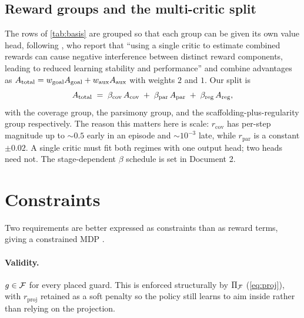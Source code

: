 \documentclass[11pt,a4paper]{article}
\begin{document}
\subsection{Reward groups and the multi-critic split}

The rows of \cref{tab:basis} are grouped so that each group can be given its own value
head, following \citet{wang2025vision}, who report that ``using a single critic to estimate
combined rewards can cause negative interference between distinct reward components,
leading to reduced learning stability and performance'' and combine advantages as
$A_{\mathrm{total}} = w_{\mathrm{goal}}A_{\mathrm{goal}} + w_{\mathrm{aux}}A_{\mathrm{aux}}$
with weights $2$ and $1$. Our split is
\begin{equation}\label{eq:multicritic}
  A_{\mathrm{total}}
  \;=\; \beta_{\mathrm{cov}}\,A_{\mathrm{cov}}
  \;+\; \beta_{\mathrm{par}}\,A_{\mathrm{par}}
  \;+\; \beta_{\mathrm{reg}}\,A_{\mathrm{reg}} ,
\end{equation}
with the coverage group, the parsimony group, and the scaffolding-plus-regularity group
respectively. The reason this matters here is scale: $r_{\mathrm{cov}}$ has per-step
magnitude up to $\sim 0.5$ early in an episode and $\sim 10^{-3}$ late, while
$r_{\mathrm{par}}$ is a constant $\pm 0.02$. A single critic must fit both regimes with one
output head; two heads need not. The stage-dependent $\beta$ schedule is set in Document 2.

\section{Constraints}\label{sec:constraints}

Two requirements are better expressed as constraints than as reward terms, giving a
constrained MDP \cite{altman1999}.

\paragraph{Validity.} $g \in \mathcal{F}$ for every placed guard. This is enforced structurally
by $\Pi_{\mathcal{F}}$ (\cref{eq:proj}), with $r_{\mathrm{proj}}$ retained as a soft penalty so the policy
still learns to aim inside rather than relying on the projection.
\end{document}
